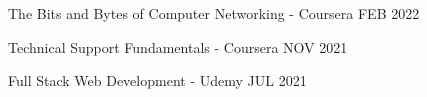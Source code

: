 The Bits and Bytes of Computer Networking - Coursera	\hfill FEB 2022

Technical Support Fundamentals - Coursera	\hfill NOV 2021

Full Stack Web Development - Udemy	\hfill JUL 2021